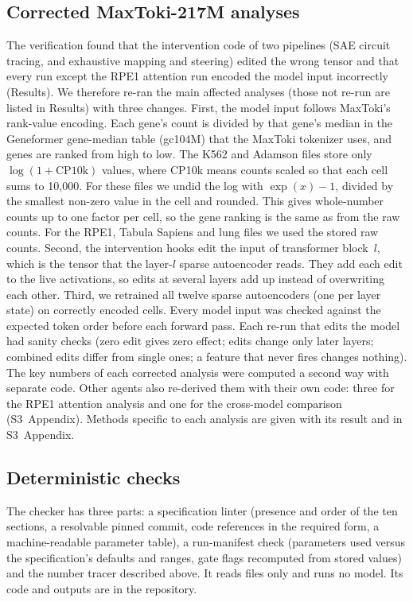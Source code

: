 \documentclass[10pt,letterpaper]{article}
\begin{document}
\subsection*{Corrected MaxToki-217M analyses}
The verification found that the intervention code of two pipelines (SAE
circuit tracing, and exhaustive mapping and steering) edited the wrong
tensor and that every run except the RPE1 attention run encoded the model
input incorrectly (Results). We therefore re-ran the main affected
analyses (those not re-run are listed in Results) with three changes.
First, the model input follows MaxToki's rank-value encoding. Each gene's count is divided by that gene's median in the
Geneformer gene-median table (gc104M) that the MaxToki tokenizer uses,
and genes are ranked from high to low. The K562 and Adamson files store
only $\log(1+\text{CP10k})$ values, where CP10k means counts scaled so
that each cell sums to 10,000. For these files we undid the log with
$\exp(x)-1$, divided by the smallest non-zero value in the cell and
rounded. This gives whole-number counts up to one factor per cell, so the
gene ranking is the same as from the raw counts. For the RPE1, Tabula
Sapiens and lung files we used the stored raw counts. Second, the
intervention hooks edit the input of transformer block~$l$, which is the
tensor that the layer-$l$ sparse autoencoder reads. They add each edit to
the live activations, so edits at several layers add up instead of
overwriting each other. Third, we retrained all twelve sparse
autoencoders (one per layer state) on correctly encoded cells. Every
model input was checked against the expected token order before each
forward pass. Each re-run that edits the model had sanity checks (zero
edit gives zero effect; edits change only later layers; combined edits
differ from single ones; a feature that never fires changes nothing). The
key numbers of each corrected analysis were computed a second way with
separate code. Other agents also re-derived them with their own code:
three for the RPE1 attention analysis and one for the cross-model
comparison (S3~Appendix). Methods
specific to each analysis are given with its result and in S3~Appendix.

\subsection*{Deterministic checks}
The checker has three parts: a specification linter (presence and order
of the ten sections, a resolvable pinned commit, code references in the
required form, a machine-readable parameter table), a run-manifest check
(parameters used versus the specification's defaults and ranges, gate
flags recomputed from stored values) and the number tracer described
above. It reads files only and runs no model. Its code and outputs are in
the repository.
\end{document}
